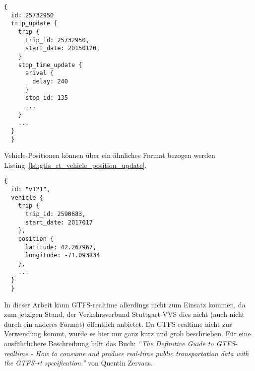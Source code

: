       \begin{lstlisting}[captionpos=b, caption={Auszug eines GTFS-realtime Trip Updates von MBTA},label={lst:gtfs_rt_trip_update}]
  {
  id: 25732950
  trip_update {
    trip {
      trip_id: 25732950,
      start_date: 20150120,
    }
    stop_time_update {
      arival {
        delay: 240
      }
      stop_id: 135
      ...
    }
    ...
  }
  }
    \end{lstlisting}

    Vehicle-Positionen können über ein ähnliches Format bezogen werden Listing~\ref{lst:gtfs_rt_vehicle_position_update}.

    \begin{lstlisting}[captionpos={b},caption={Auszug eines GTFS-realtime Vehicle-Position Updates von MBTA},label={lst:gtfs_rt_vehicle_position_update}]
  {
  id: "v121",
  vehicle {
    trip {
      trip_id: 2590683,
      start_date: 2017017
    },
    position {
      latitude: 42.267967,
      longitude: -71.093834
    },
    ...
  }
  }
    \end{lstlisting}

    In dieser Arbeit kann GTFS-realtime allerdings nicht zum Einsatz kommen, da zum jetzigen Stand, der Verkehrsverbund Stuttgart-VVS dies nicht (auch nicht durch ein anderes Format) öffentlich anbietet. Da GTFS-realtime nicht zur Verwendung kommt, wurde es hier nur ganz kurz und grob beschrieben. Für eine ausführlichere Beschreibung hilft das Buch: \textit{"`The Definitive Guide to GTFS-realtime - How to consume and produce real-time public transportation data with the GTFS-rt specification."'}\parencite{zervaas_realtime} von Quentin Zervaas.\\


